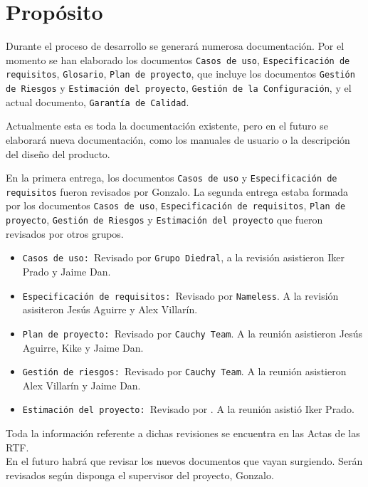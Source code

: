 \documentclass[spanish,a4paper,11pt, twoside]{report}	%
\begin{document}
	
	\section{Propósito}
			Durante el proceso de desarrollo se generará numerosa documentación.
		Por el momento se han elaborado los documentos \texttt{Casos de uso}, \texttt{Especificación de requisitos}, \texttt{Glosario}, \texttt{Plan de proyecto}, 
		que incluye los documentos \texttt{Gestión de Riesgos} y \texttt{Estimación del proyecto}, \texttt{Gestión de la Configuración}, 
		y el actual documento, \texttt{Garantía de Calidad}.

		Actualmente esta es toda la documentación existente, pero en el futuro se elaborará nueva documentación, 
		como los manuales de usuario o la descripción del diseño del producto.

			En la primera entrega, los documentos \texttt{Casos de uso} y \texttt{Especificación de requisitos} fueron revisados por Gonzalo. 
		La segunda entrega estaba formada por los documentos \texttt{Casos de uso}, \texttt{Especificación de requisitos}, \texttt{Plan de proyecto}, 
		\texttt{Gestión de Riesgos} y \texttt{Estimación del proyecto} que fueron revisados por otros grupos.
		 \begin{itemize}
		   \item \texttt{Casos de uso: }Revisado por \texttt{Grupo Diedral}, a la revisión asistieron Iker Prado y Jaime Dan.
		   \item \texttt{Especificación de requisitos: }Revisado por \texttt{Nameless}. A la revisión asisiteron Jesús Aguirre y Alex Villarín.
		   \item \texttt{Plan de proyecto: }Revisado por \texttt{Cauchy Team}. A la reunión asistieron Jesús Aguirre, Kike y Jaime Dan.
		   \item \texttt{Gestión de riesgos: }Revisado por \texttt{Cauchy Team}. A la reunión asistieron Alex Villarín y Jaime Dan.
		   \item \texttt{Estimación del proyecto: }Revisado por \texttt{}. A la reunión asistió Iker Prado.%
		 \end{itemize}
		 Toda la información referente a dichas revisiones se encuentra en las Actas de las RTF.\\
		 En el futuro habrá que revisar los nuevos documentos que vayan surgiendo. Serán revisados según disponga el supervisor del proyecto, Gonzalo.
		 
\end{document}
